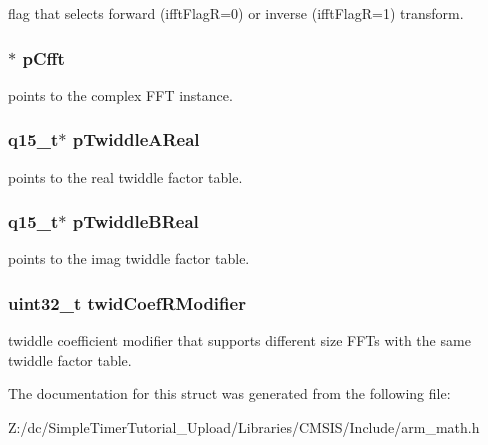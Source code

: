 flag that selects forward (ifft\-Flag\-R=0) or inverse (ifft\-Flag\-R=1) transform. \hypertarget{structarm__rfft__instance__q15_ae0ac7c3a89699793fc0dac960db7f056}{
\subsubsection[{p\-Cfft}]{$\ast$ p\-Cfft}}\label{structarm__rfft__instance__q15_ae0ac7c3a89699793fc0dac960db7f056}
points to the complex F\-F\-T instance. \hypertarget{structarm__rfft__instance__q15_ac17beaa033ab1ea242d49037276b67e2}{
\subsubsection[{p\-Twiddle\-A\-Real}]{\setlength{\rightskip}{0pt plus 5cm}q15\-\_\-t$\ast$ p\-Twiddle\-A\-Real}}\label{structarm__rfft__instance__q15_ac17beaa033ab1ea242d49037276b67e2}
points to the real twiddle factor table. \hypertarget{structarm__rfft__instance__q15_a67a618de57c3a7420ee05fda1a80bf3a}{
\subsubsection[{p\-Twiddle\-B\-Real}]{\setlength{\rightskip}{0pt plus 5cm}q15\-\_\-t$\ast$ p\-Twiddle\-B\-Real}}\label{structarm__rfft__instance__q15_a67a618de57c3a7420ee05fda1a80bf3a}
points to the imag twiddle factor table. \hypertarget{structarm__rfft__instance__q15_a5b06f7f76c018db993fe6acc5708c589}{
\subsubsection[{twid\-Coef\-R\-Modifier}]{\setlength{\rightskip}{0pt plus 5cm}uint32\-\_\-t twid\-Coef\-R\-Modifier}}\label{structarm__rfft__instance__q15_a5b06f7f76c018db993fe6acc5708c589}
twiddle coefficient modifier that supports different size F\-F\-Ts with the same twiddle factor table. 

The documentation for this struct was generated from the following file\-:\begin{DoxyCompactItemize}
\item 
Z\-:/dc/\-Simple\-Timer\-Tutorial\-\_\-\-Upload/\-Libraries/\-C\-M\-S\-I\-S/\-Include/arm\-\_\-math.\-h\end{DoxyCompactItemize}
